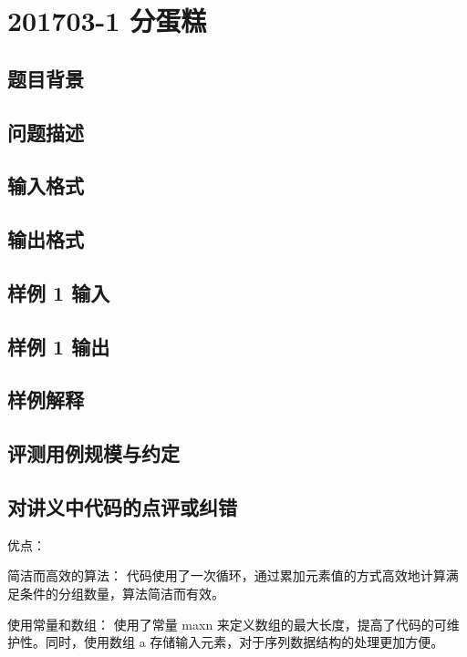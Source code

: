 \section{201703-1 分蛋糕}

\subsection{题目背景}

\subsection{问题描述}

\subsection{输入格式}

\subsection{输出格式}

\subsection{样例 1 输入}

\subsection{样例 1 输出}

\subsection{样例解释}

\subsection{评测用例规模与约定}

\subsection{对讲义中代码的点评或纠错}
 
优点：

简洁而高效的算法： 代码使用了一次循环，通过累加元素值的方式高效地计算满足条件的分组数量，算法简洁而有效。

使用常量和数组： 使用了常量 maxn 来定义数组的最大长度，提高了代码的可维护性。同时，使用数组 a 存储输入元素，对于序列数据结构的处理更加方便。

